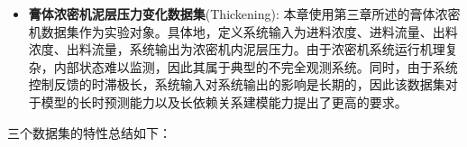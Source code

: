 \begin{itemize}
    \item \textbf{膏体浓密机泥层压力变化数据集}(Thickening):
    本章使用第三章所述的膏体浓密机数据集作为实验对象。具体地，定义系统输入为进料浓度、进料流量、出料浓度、出料流量，系统输出为浓密机内泥层压力。由于浓密机系统运行机理复杂，内部状态难以监测，因此其属于典型的不完全观测系统。同时，由于系统控制反馈的时滞极长，系统输入对系统输出的影响是长期的，因此该数据集对于模型的长时预测能力以及长依赖关系建模能力提出了更高的要求。
    
\end{itemize}
三个数据集的特性总结如下：
\begin{table}
\centering
{}
\caption{数据集特性}

\label{tab:dataset}
\end{table}
